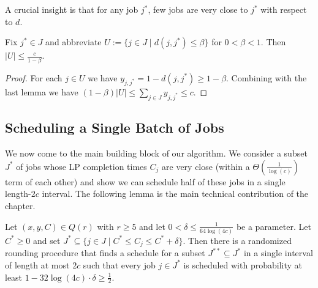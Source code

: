 A crucial insight is that for any job $j^*$, few jobs are very close to $j^*$ with respect to $d$.

\begin{lemma} \label{lem:SmallNeighborhoodOfClosePoints}
Fix $j^* \in J$ and abbreviate $U := \{ j \in J \mid d(j,j^*) \leq \beta\}$ for $0<\beta<1$. Then $|U| \leq \frac{c}{1-\beta}$. 
\end{lemma}
\begin{proof}
  For each $j \in U$ we have $y_{j,j^*} = 1 - d(j,j^*) \geq 1-\beta$. Combining with the last
  lemma we have $(1-\beta)|U|\leq\sum_{j \in J} y_{j,j^*} \leq c$.
\end{proof}






\subsection{Scheduling a Single Batch of Jobs}
\label{subsec:singlebatch}

We now come to the  main building block of our algorithm. We consider a subset $J^*$ of
jobs whose LP completion times $C_j$ are very close (within a $\Theta(\frac{1}{\log(c)})$ term of each other)
and show we can schedule half of these jobs in a single length-$2c$ interval. 
The following lemma is the main technical contribution of the chapter.

\begin{lemma} \label{lem:SchedulingOneIntervalViaCKR}
  Let $(x,y,C) \in Q(r)$ with $r \geq 5$ and let $0<\delta \leq \frac{1}{64\log(4c)}$ be a parameter. Let $C^* \geq 0$ and set
   $J^* \subseteq \{ j \in J \mid C^* \leq C_j \leq C^*+\delta\}$.
  Then there is a randomized rounding procedure that finds a schedule for a subset $J^{**} \subseteq J^*$ in a single interval of length at most $2c$  such that every job $j \in J^*$
  is scheduled with probability at least $1 - 32 \log(4 c) \cdot \delta \geq\frac{1}{2}$.
\end{lemma}

